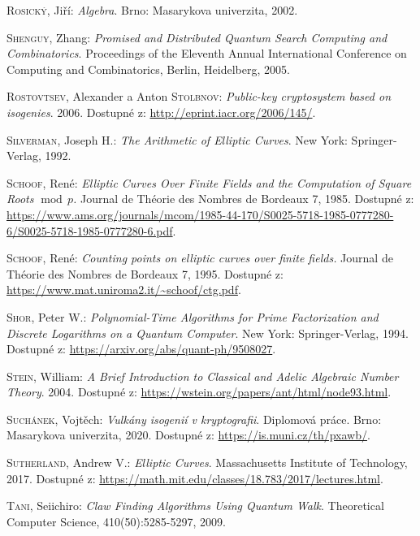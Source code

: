 \documentclass[12pt]{report}
\begin{document}
\begin{thebibliography}{97}
\textsc{Rosický}, Jiří: \textit{Algebra}. Brno: Masarykova univerzita, 2002.

\textsc{Shenguy}, Zhang: \textit{Promised and Distributed Quantum Search Computing and Combinatorics}. Proceedings of the Eleventh  Annual  International Conference on Computing  and Combinatorics, Berlin, Heidelberg, 2005.

\textsc{Rostovtsev}, Alexander a Anton \textsc{Stolbnov}:\textit{ Public-key cryptosystem based on isogenies}. 2006. Dostupné z: \url{http://eprint.iacr.org/2006/145/}. 

\textsc{Silverman}, Joseph H.: \textit{The Arithmetic of Elliptic Curves}. New York: Springer-Verlag, 1992. 

\textsc{Schoof}, René: \textit{Elliptic Curves Over Finite Fields and the Computation of Square Roots $\! \operatorname{mod} \, p$.} Journal de Théorie des Nombres de Bordeaux 7, 1985. Dostupné z: \url{https://www.ams.org/journals/mcom/1985-44-170/S0025-5718-1985-0777280-6/S0025-5718-1985-0777280-6.pdf}.

\textsc{Schoof}, René: \textit{Counting points on elliptic curves over finite fields.} Journal de Théorie des Nombres de Bordeaux 7, 1995. Dostupné z: \url{https://www.mat.uniroma2.it/~schoof/ctg.pdf}.

\textsc{Shor}, Peter W.: \textit{Polynomial-Time Algorithms for Prime Factorization and Discrete Logarithms on a Quantum Computer}. New York: Springer-Verlag, 1994. Dostupné z: \url{https://arxiv.org/abs/quant-ph/9508027}.

\textsc{Stein}, William: \textit{A Brief Introduction to Classical and Adelic Algebraic Number Theory}. 2004. Dostupné z: \url{https://wstein.org/papers/ant/html/node93.html}.


\textsc{Suchánek}, Vojtěch: \textit{Vulkány isogenií v kryptografii}. Diplomová práce. Brno: Masarykova univerzita, 2020. Dostupné z: \url{https://is.muni.cz/th/pxawb/}.

\textsc{Sutherland}, Andrew V.: \textit{Elliptic Curves}. Massachusetts Institute of Technology, 2017. Dostupné z: \url{https://math.mit.edu/classes/18.783/2017/lectures.html}. 

\textsc{Tani}, Seiichiro: \textit{Claw Finding Algorithms Using Quantum Walk}. Theoretical Computer Science, 410(50):5285-5297, 2009.


\end{thebibliography}
\end{document}
